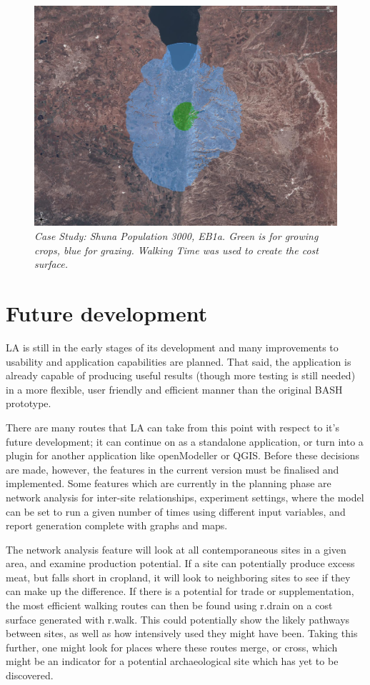 \begin{figure}[htbp] %
  \includegraphics[scale=0.225]{./images/LEB130007030FallowSlope.jpg}
  \caption{\label{fig:caseStudy}\textit{Case Study: Shuna  Population 3000, EB1a. 
    Green is for growing crops, blue for grazing.  Walking Time was used to
    create the cost surface.}}
\end{figure}

\section{Future development} \label{FuturePlans} 
  LA is still in the early stages of its development and many
  improvements to usability and application capabilities are planned. That said,
  the application is already capable of producing useful results (though more
  testing is still needed) in a more flexible, user friendly and efficient
  manner than the original BASH prototype.
  
  There are many routes that LA can take from this point with
  respect to it's future development; it can continue on as a standalone
  application, or turn into a plugin for another application like openModeller
  or QGIS.  Before these decisions are made, however, the features in the current
  version must be finalised and implemented.  Some features which are currently
  in the planning phase are network analysis  for inter-site relationships,
  experiment settings, where the model can be set to run a given number of times
  using different input variables, and report generation complete with graphs
  and maps. 
  
  The network analysis feature will look at all contemporaneous sites in a given
  area, and examine production potential.  If a site can potentially produce
  excess meat, but falls short in cropland, it will look to neighboring sites to
  see if they can make up the difference.  If there is a potential for trade or
  supplementation, the most efficient walking routes can then be found using
  r.drain on a cost surface generated with r.walk.  This could potentially show
  the likely pathways between sites, as well as how intensively used they might
  have been.  Taking this further, one might look for places where these routes
  merge, or cross, which might be an indicator for a potential archaeological
  site which has yet to be discovered.
  
